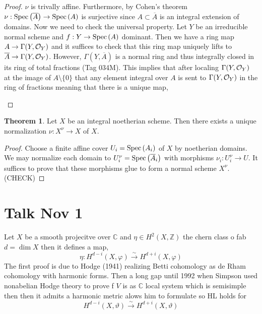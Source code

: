 \documentclass[12pt]{extarticle}
\newcommand{\Z}{\mathbb{Z}}
\theoremstyle{definition}
\newtheorem{theorem}{Theorem}[section]
\newcommand{\C}{\mathbb{C}}
\begin{document}
\begin{proof}
$\nu$ is trivally affine. Furthermore, by Cohen's theorem $\nu : \mathrm{Spec}\left(\overline{A}\right) \to \mathrm{Spec}\left(A\right)$ is surjective since $A \subset \overline{A}$ is an integral extension of domains. Now we need to check the universal property. Let $Y$ be an irreducible normal scheme and $f : Y \to \mathrm{Spec}\left(A\right)$ dominant. Then we have a ring map $A \to \Gamma(Y, \mathcal{O}_{Y})$ and it suffices to check that this ring map uniquely lifts to $\overline{A} \to \Gamma(Y, \mathcal{O}_{Y})$. However, $\Gamma(Y, \overline{A})$ is a normal ring and thus integrally closed in its ring of total fractions (Tag 034M). This implies that after localing $\Gamma(Y, \mathcal{O}_{Y})$ at the image of $A \setminus \{ 0 \}$ that any element integral over $A$ is sent to $\Gamma(Y, \mathcal{O}_{Y})$ in the ring of fractions meaning that there is a unique map,
\begin{center}
\end{center}
\end{proof}

\begin{theorem}
Let $X$ be an integral noetherian scheme. Then there exists a unique normalization $\nu : X^\nu \to X$ of $X$. 
\end{theorem}

\begin{proof}
Choose a finite affine cover $U_i = \mathrm{Spec}\left(A_i\right)$ of $X$ by noetherian domains. We may normalize each domain to $U_i^\nu = \mathrm{Spec}\left(\overline{A}_i\right)$ with morphisms $\nu_i : U_i^\nu \to U$. It suffices to prove that these morphisms glue to form a normal scheme $X^\nu$. (CHECK)
\end{proof}

\section{Talk Nov 1}

Let $X$ be a smooth projecitve over $\C$ and $\eta \in H^2(X, \Z)$ the chern class o fab $d = \dim{X}$ then it defines a map,
\[ \eta : H^{d - i}(X, \varphi) \xrightarrow{\sim} H^{d + i}(X, \varphi) \]
The first proof is due to Hodge (1941) realizing Betti cohomology as de Rham cohomology with harmonic forms. Then a long gap until 1992 when Simpson used nonabelian Hodge theory to prove f $V$ is as $\C$ local system which is semisimple then then it admits a harmonic metric alows him to formulate so HL holds for
\[ H^{d-i}(X, \vartheta) \xrightarrow{\sim} H^{d+i}(X, \vartheta) \]
\end{document}
